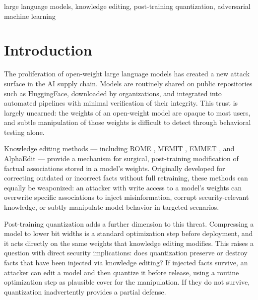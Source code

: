 \documentclass[conference]{IEEEtran}
\begin{document}
\begin{IEEEkeywords}
large language models, knowledge editing, post-training quantization, adversarial machine learning
\end{IEEEkeywords}

\section{Introduction}

The proliferation of open-weight large language models has created a new attack surface in the AI supply chain. Models are routinely shared on public repositories such as HuggingFace, downloaded by organizations, and integrated into automated pipelines with minimal verification of their integrity. This trust is largely unearned: the weights of an open-weight model are opaque to most users, and subtle manipulation of those weights is difficult to detect through behavioral testing alone.

Knowledge editing methods --- including ROME \cite{b1}, MEMIT \cite{b2}, EMMET \cite{b10}, and AlphaEdit \cite{b3} --- provide a mechanism for surgical, post-training modification of factual associations stored in a model's weights. Originally developed for correcting outdated or incorrect facts without full retraining, these methods can equally be weaponized: an attacker with write access to a model's weights can overwrite specific associations to inject misinformation, corrupt security-relevant knowledge, or subtly manipulate model behavior in targeted scenarios.

Post-training quantization adds a further dimension to this threat. Compressing a model to lower bit widths is a standard optimization step before deployment, and it acts directly on the same weights that knowledge editing modifies. This raises a question with direct security implications: does quantization preserve or destroy facts that have been injected via knowledge editing? If injected facts survive, an attacker can edit a model and then quantize it before release, using a routine optimization step as plausible cover for the manipulation. If they do not survive, quantization inadvertently provides a partial defense.
\end{document}
